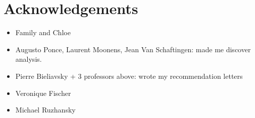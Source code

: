 \chapter*{Acknowledgements}

\begin{itemize}
    \item Family and Chloe
    \item Augusto Ponce, Laurent Moonens, Jean Van Schaftingen: made me discover analysis.
    \item Pierre Bieliavsky + 3 professors above: wrote my recommendation letters
    \item Veronique Fischer
    \item Michael Ruzhansky
\end{itemize}
